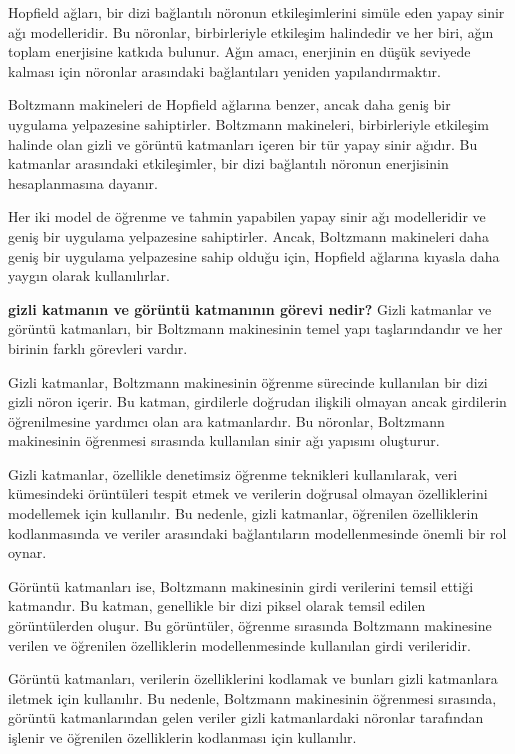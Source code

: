 \documentclass[11pt]{article}
\begin{document}
Hopfield ağları, bir dizi bağlantılı nöronun etkileşimlerini simüle eden yapay sinir ağı modelleridir. Bu nöronlar, birbirleriyle etkileşim halindedir ve her biri, ağın toplam enerjisine katkıda bulunur. Ağın amacı, enerjinin en düşük seviyede kalması için nöronlar arasındaki bağlantıları yeniden yapılandırmaktır.

Boltzmann makineleri de Hopfield ağlarına benzer, ancak daha geniş bir uygulama yelpazesine sahiptirler. Boltzmann makineleri, birbirleriyle etkileşim halinde olan gizli ve görüntü katmanları içeren bir tür yapay sinir ağıdır. Bu katmanlar arasındaki etkileşimler, bir dizi bağlantılı nöronun enerjisinin hesaplanmasına dayanır.

Her iki model de öğrenme ve tahmin yapabilen yapay sinir ağı modelleridir ve geniş bir uygulama yelpazesine sahiptirler. Ancak, Boltzmann makineleri daha geniş bir uygulama yelpazesine sahip olduğu için, Hopfield ağlarına kıyasla daha yaygın olarak kullanılırlar.

\textbf{gizli katmanın ve görüntü katmanının görevi nedir?}
Gizli katmanlar ve görüntü katmanları, bir Boltzmann makinesinin temel yapı taşlarındandır ve her birinin farklı görevleri vardır.

Gizli katmanlar, Boltzmann makinesinin öğrenme sürecinde kullanılan bir dizi gizli nöron içerir. Bu katman, girdilerle doğrudan ilişkili olmayan ancak girdilerin öğrenilmesine yardımcı olan ara katmanlardır. Bu nöronlar, Boltzmann makinesinin öğrenmesi sırasında kullanılan sinir ağı yapısını oluşturur.

Gizli katmanlar, özellikle denetimsiz öğrenme teknikleri kullanılarak, veri kümesindeki örüntüleri tespit etmek ve verilerin doğrusal olmayan özelliklerini modellemek için kullanılır. Bu nedenle, gizli katmanlar, öğrenilen özelliklerin kodlanmasında ve veriler arasındaki bağlantıların modellenmesinde önemli bir rol oynar.

Görüntü katmanları ise, Boltzmann makinesinin girdi verilerini temsil ettiği katmandır. Bu katman, genellikle bir dizi piksel olarak temsil edilen görüntülerden oluşur. Bu görüntüler, öğrenme sırasında Boltzmann makinesine verilen ve öğrenilen özelliklerin modellenmesinde kullanılan girdi verileridir.

Görüntü katmanları, verilerin özelliklerini kodlamak ve bunları gizli katmanlara iletmek için kullanılır. Bu nedenle, Boltzmann makinesinin öğrenmesi sırasında, görüntü katmanlarından gelen veriler gizli katmanlardaki nöronlar tarafından işlenir ve öğrenilen özelliklerin kodlanması için kullanılır.
\end{document}
